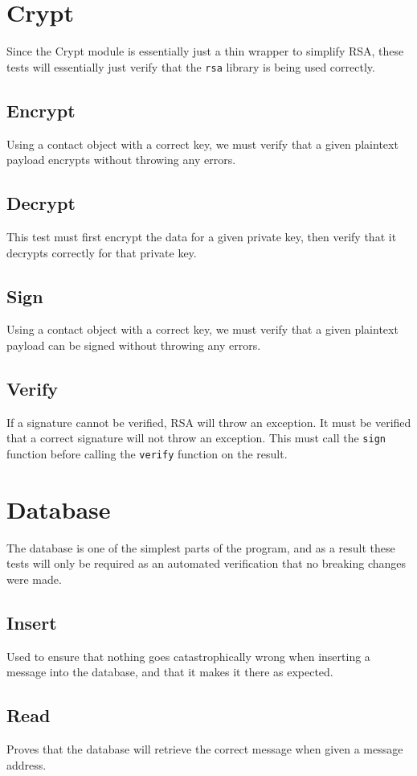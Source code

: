 \documentclass[titlepage]{report}
\begin{document}
\section{Crypt}
Since the Crypt module is essentially just a thin wrapper to simplify RSA, these tests will essentially just verify that the \texttt{rsa} library is being used correctly.
\subsection{Encrypt}
Using a contact object with a correct key, we must verify that a given plaintext payload encrypts without throwing any errors.
\subsection{Decrypt}
This test must first encrypt the data for a given \gls{private key}, then verify that it decrypts correctly for that \gls{private key}.
\subsection{Sign}
Using a contact object with a correct key, we must verify that a given plaintext payload can be signed without throwing any errors.
\subsection{Verify}
If a signature cannot be verified, RSA will throw an exception. It must be verified that a correct signature will not throw an exception. This must call the \texttt{sign} function before calling the \texttt{verify} function on the result.

\section{Database}
The database is one of the simplest parts of the program, and as a result these tests will only be required as an automated verification that no breaking changes were made.
\subsection{Insert}
Used to ensure that nothing goes catastrophically wrong when inserting a message into the database, and that it makes it there as expected.
\subsection{Read}
Proves that the database will retrieve the correct message when given a message address.
\end{document}
